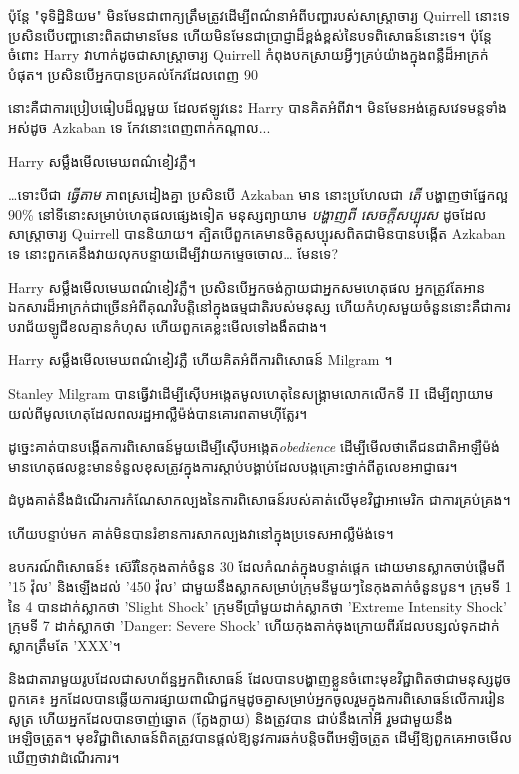 {{{{{{{ប៉ុន្តែ "ទុទិដ្ឋិនិយម" មិនមែនជាពាក្យត្រឹមត្រូវដើម្បីពណ៌នាអំពីបញ្ហារបស់សាស្រ្តាចារ្យ Quirrell នោះទេ ប្រសិនបើបញ្ហានោះពិតជាមានមែន ហើយមិនមែនជាប្រាជ្ញាដ៏ខ្ពង់ខ្ពស់នៃបទពិសោធន៍នោះទេ។ ប៉ុន្តែចំពោះ Harry វាហាក់ដូចជាសាស្រ្តាចារ្យ Quirrell កំពុងបកស្រាយអ្វីៗគ្រប់យ៉ាងក្នុងពន្លឺដ៏អាក្រក់បំផុត។ ប្រសិនបើអ្នកបានប្រគល់កែវដែលពេញ 90%

នោះ​គឺ​ជា​ការ​ប្រៀប​ធៀប​ដ៏​ល្អ​មួយ ដែល​ឥឡូវ​នេះ Harry បាន​គិត​អំពី​វា។ មិនមែនអង់គ្លេសវេទមន្តទាំងអស់ដូច Azkaban ទេ កែវនោះពេញពាក់កណ្តាល...

Harry សម្លឹងមើលមេឃពណ៌ខៀវភ្លឺ។

…ទោះបីជា \emph{ធ្វើតាម} ភាពស្រដៀងគ្នា ប្រសិនបើ Azkaban មាន នោះប្រហែលជា \emph{តើ} បង្ហាញថាផ្នែកល្អ 90\% នៅទីនោះសម្រាប់ហេតុផលផ្សេងទៀត មនុស្សព្យាយាម \emph{ បង្ហាញពី សេចក្តីសប្បុរស } ដូចដែលសាស្រ្តាចារ្យ Quirrell បាននិយាយ។ ត្បិត​បើ​ពួក​គេ​មាន​ចិត្ត​សប្បុរស​ពិត​ជា​មិន​បាន​បង្កើត Azkaban ទេ នោះ​ពួក​គេ​នឹង​វាយ​លុក​បន្ទាយ​ដើម្បី​វាយ​កម្ទេច​ចោល… មែន​ទេ?

Harry សម្លឹងមើលមេឃពណ៌ខៀវភ្លឺ។ ប្រសិនបើអ្នកចង់ក្លាយជាអ្នកសមហេតុផល អ្នកត្រូវតែអានឯកសារដ៏អាក្រក់ជាច្រើនអំពីគុណវិបត្តិនៅក្នុងធម្មជាតិរបស់មនុស្ស ហើយកំហុសមួយចំនួននោះគឺជាការបរាជ័យឡូជីខលគ្មានកំហុស ហើយពួកគេខ្លះមើលទៅងងឹតជាង។

Harry សម្លឹងមើលមេឃពណ៌ខៀវភ្លឺ ហើយគិតអំពីការពិសោធន៍ Milgram ។

Stanley Milgram បានធ្វើ​វា​ដើម្បី​ស៊ើបអង្កេត​មូលហេតុ​នៃ​សង្គ្រាមលោក​លើក​ទី II ដើម្បី​ព្យាយាម​យល់​ពី​មូលហេតុ​ដែល​ពលរដ្ឋ​អាល្លឺម៉ង់​បាន​គោរព​តាម​ហ៊ីត្លែរ។

ដូច្នេះគាត់បានបង្កើតការពិសោធន៍មួយដើម្បីស៊ើបអង្កេត\emph{obedience} ដើម្បីមើលថាតើជនជាតិអាឡឺម៉ង់មានហេតុផលខ្លះមានទំនួលខុសត្រូវក្នុងការស្តាប់បង្គាប់ដែលបង្កគ្រោះថ្នាក់ពីតួលេខអាជ្ញាធរ។

ដំបូងគាត់នឹងដំណើរការកំណែសាកល្បងនៃការពិសោធន៍របស់គាត់លើមុខវិជ្ជាអាមេរិក ជាការគ្រប់គ្រង។

ហើយ​បន្ទាប់​មក គាត់​មិន​បាន​រំខាន​ការ​សាកល្បង​វា​នៅ​ក្នុង​ប្រទេស​អាល្លឺម៉ង់​ទេ។

ឧបករណ៍ពិសោធន៍៖ ស៊េរីនៃកុងតាក់ចំនួន 30 ដែលកំណត់ក្នុងបន្ទាត់ផ្តេក ដោយមានស្លាកចាប់ផ្តើមពី '15 វ៉ុល' និងឡើងដល់ '450 វ៉ុល' ជាមួយនឹងស្លាកសម្រាប់ក្រុមនីមួយៗនៃកុងតាក់ចំនួនបួន។ ក្រុមទី 1 នៃ 4 បានដាក់ស្លាកថា 'Slight Shock' ក្រុមទីប្រាំមួយដាក់ស្លាកថា 'Extreme Intensity Shock' ក្រុមទី 7 ដាក់ស្លាកថា 'Danger: Severe Shock' ហើយកុងតាក់ចុងក្រោយពីរដែលបន្សល់ទុកដាក់ស្លាកត្រឹមតែ 'XXX'។

និងជាតារាមួយរូបដែលជាសហព័ន្ឋអ្នកពិសោធន៍ ដែលបានបង្ហាញខ្លួនចំពោះមុខវិជ្ជាពិតថាជាមនុស្សដូចពួកគេ៖ អ្នកដែលបានឆ្លើយការផ្សាយពាណិជ្ជកម្មដូចគ្នាសម្រាប់អ្នកចូលរួមក្នុងការពិសោធន៍លើការរៀនសូត្រ ហើយអ្នកដែលបានចាញ់ឆ្នោត (ក្លែងក្លាយ) និងត្រូវបាន ជាប់នឹងកៅអី រួមជាមួយនឹងអេឡិចត្រូត។ មុខវិជ្ជា​ពិសោធន៍​ពិត​ត្រូវ​បាន​ផ្តល់​ឱ្យ​នូវ​ការ​ឆក់​បន្តិច​ពី​អេឡិចត្រូត ដើម្បី​ឱ្យ​ពួក​គេ​អាច​មើល​ឃើញ​ថា​វា​ដំណើរការ។

}}}}}}}
